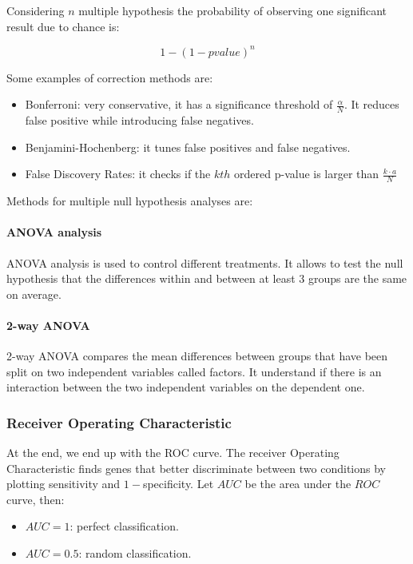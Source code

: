 		Considering $n$ multiple hypothesis the probability of observing one significant result due to chance is:

		$$1-(1-pvalue)^n$$

		Some examples of correction methods are:

		\begin{multicols}{2}
			\begin{itemize}
				\item Bonferroni: very conservative, it has a significance threshold of $\frac{\alpha}{N}$. 
					It reduces false positive while introducing false negatives.
				\item Benjamini-Hochenberg: it tunes false positives and false negatives.
				\item False Discovery Rates: it checks if the $kth$ ordered p-value is larger than $\frac{k\cdot a}{N}$
			\end{itemize}
		\end{multicols}
		
		Methods for multiple null hypothesis analyses are:
		
		\paragraph{ANOVA analysis}
			ANOVA analysis is used to control different treatments.
			It allows to test the null hypothesis that the differences within and between at least $3$ groups are the same on average.

			\paragraph{2-way ANOVA}
			2-way ANOVA compares the mean differences between groups that have been split on two independent variables called factors.
			It understand if there is an interaction between the two independent variables on the dependent one.
		
	
		\subsubsection{Receiver Operating Characteristic}
		At the end, we end up with the ROC curve.
		The receiver Operating Characteristic finds genes that better discriminate between two conditions by plotting sensitivity and $1-$specificity.
		Let $AUC$ be the area under the $ROC$ curve, then:

		\begin{multicols}{2}
			\begin{itemize}
				\item $AUC=1$: perfect classification.
				\item $AUC = 0.5$: random classification.
			\end{itemize}
		\end{multicols}

